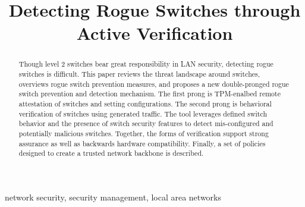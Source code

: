 \documentclass[journal]{IEEEtran}
\begin{document}
\title{Detecting Rogue Switches through Active Verification}

\author{
}

\maketitle



\begin{abstract}
Though level 2 switches bear great responsibility in LAN security, detecting rogue switches is
difficult. This paper reviews the threat landscape around switches, overviews rogue switch
prevention measures, and proposes a new double-pronged rogue switch prevention and detection
mechanism. The first prong is TPM-enalbed remote attestation of switches and setting configurations.
The second prong is behavioral verification of switches using generated traffic. The tool leverages
defined switch behavior and the presence of switch security features to detect mis-configured and
potentially malicious switches. Together, the forms of verification support strong assurance as well
as backwards hardware compatibility. Finally, a set of policies designed to create a trusted
network backbone is described.

\end{abstract}

\begin{IEEEkeywords}
network security, security management, local area networks
\end{IEEEkeywords}
\end{document}
